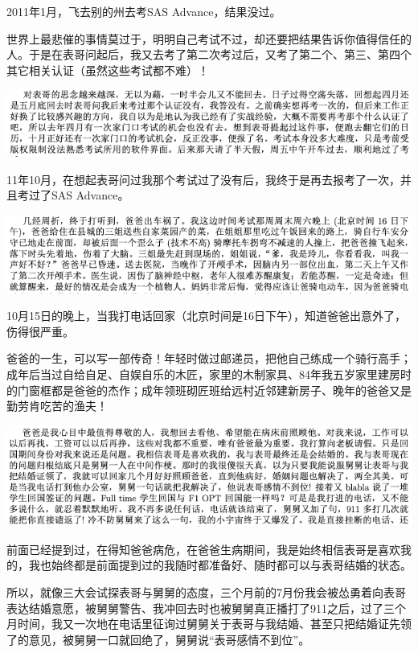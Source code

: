 \documentclass[9pt, b5paper]{article}
\begin{document}
2011年1月，飞去别的州去考SAS Advance，结果没过。

世界上最悲催的事情莫过于，明明自己考试不过，却还要把结果告诉你值得信任的人。于是在表哥问起后，我又去考了第二次考过后，又考了第二个、第三、第四个其它相关认证（虽然这些考试都不难）！

\begin{center}
\includegraphics[width=.9\linewidth]{./pic/backups_plans_20210414_165509.png}
\end{center}

11年10月，在想起表哥问过我那个考试过了没有后，我终于是再去报考了一次，并且考过了SAS Advance。 

\begin{center}
\includegraphics[width=.9\linewidth]{./pic/backups_plans_20210414_193202.png}
\end{center}

10月15日的晚上，当我打电话回家（北京时间是16日下午），知道爸爸出意外了，伤得很严重。

爸爸的一生，可以写一部传奇！年轻时做过邮递员，把他自己练成一个骑行高手；成年后当过自给自足、自娱自乐的木匠，家里的木制家具、84年我五岁家里建房时的门窗框都是爸爸的杰作；成年领班砌匠班给远村近邻建新房子、晚年的爸爸又是勤劳肯吃苦的渔夫！  

\begin{center}
\includegraphics[width=.9\linewidth]{./pic/backups_plans_20210414_201442.png}
\end{center}

前面已经提到过，在得知爸爸病危，在爸爸生病期间，我是始终相信表哥是喜欢我的，我也始终都是前面提到过的我随时都准备好、随时都可以与表哥结婚的状态。

所以，就像三大会试探表哥与舅舅的态度，三个月前的7月份我会被怂勇着向表哥表达结婚意愿，被舅舅警告、我冲回去时也被舅舅真正播打了911之后，过了三个月时间，我又一次地在电话里征询过舅舅关于表哥与我结婚、甚至只把结婚证先领了的意见，被舅舅一口就回绝了，舅舅说“表哥感情不到位”。
\end{document}
